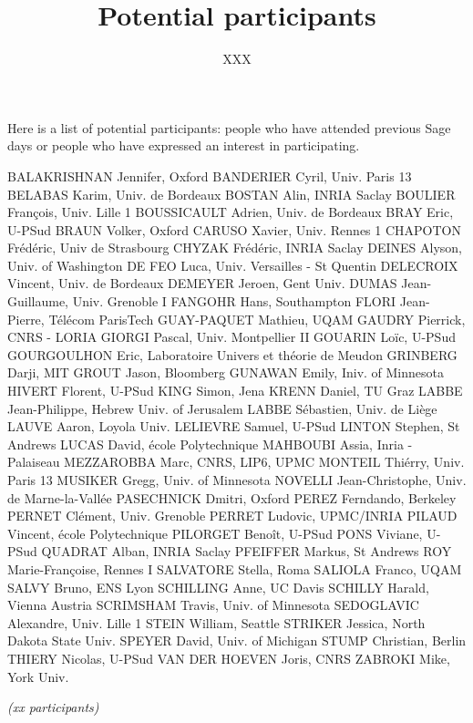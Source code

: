 \documentclass{paper}
\title{Potential participants}
\subtitle{XXX}
\date{}
\begin{document}
\maketitle
\thispagestyle{empty}

Here is a list of potential participants: people who have attended previous Sage days 
or people who have expressed an interest in participating. 

\bigskip

\obeylines
BALAKRISHNAN Jennifer, Oxford 
BANDERIER Cyril, Univ. Paris 13
BELABAS Karim, Univ. de Bordeaux
BOSTAN Alin, INRIA Saclay
BOULIER François, Univ. Lille 1
BOUSSICAULT Adrien, Univ. de Bordeaux
BRAY Eric, U-PSud
BRAUN Volker, Oxford
CARUSO Xavier, Univ. Rennes 1
CHAPOTON Frédéric, Univ de Strasbourg
CHYZAK Frédéric, INRIA Saclay
DEINES Alyson, Univ. of Washington
DE FEO Luca, Univ. Versailles - St Quentin
DELECROIX Vincent, Univ. de Bordeaux
DEMEYER Jeroen, Gent Univ.
DUMAS Jean-Guillaume, Univ. Grenoble I
FANGOHR Hans, Southampton
FLORI Jean-Pierre, Télécom ParisTech
GUAY-PAQUET Mathieu, UQAM
GAUDRY Pierrick, CNRS - LORIA
GIORGI Pascal, Univ. Montpellier II
GOUARIN Loïc, U-PSud
GOURGOULHON Eric, Laboratoire Univers et théorie de Meudon
GRINBERG Darji, MIT
GROUT Jason, Bloomberg
GUNAWAN Emily, Iniv. of Minnesota
HIVERT Florent, U-PSud
KING Simon, Jena
KRENN Daniel, TU Graz
LABBE Jean-Philippe, Hebrew Univ. of Jerusalem
LABBE Sébastien, Univ. de Liège
LAUVE Aaron, Loyola Univ.
LELIEVRE Samuel, U-PSud
LINTON Stephen, St Andrews
LUCAS David, école Polytechnique
MAHBOUBI Assia, Inria - Palaiseau
MEZZAROBBA Marc, CNRS, LIP6, UPMC
MONTEIL Thiérry, Univ. Paris 13
MUSIKER Gregg, Univ. of Minnesota
NOVELLI Jean-Christophe, Univ. de Marne-la-Vallée
PASECHNICK Dmitri, Oxford
PEREZ Ferndando, Berkeley
PERNET Clément, Univ. Grenoble
PERRET Ludovic, UPMC/INRIA
PILAUD Vincent, école Polytechnique
PILORGET Benoît, U-PSud
PONS Viviane, U-PSud
QUADRAT Alban, INRIA Saclay
PFEIFFER Markus, St Andrews
ROY Marie-Françoise, Rennes I
SALVATORE Stella, Roma
SALIOLA Franco, UQAM
SALVY Bruno, ENS Lyon
SCHILLING Anne, UC Davis
SCHILLY Harald, Vienna Austria
SCRIMSHAM Travis, Univ. of Minnesota
SEDOGLAVIC Alexandre, Univ. Lille 1
STEIN William, Seattle
STRIKER Jessica, North Dakota State Univ.
SPEYER David, Univ. of Michigan
STUMP Christian, Berlin
THIERY Nicolas, U-PSud
VAN DER HOEVEN Joris, CNRS
ZABROKI Mike, York Univ.

\medskip
\emph{(xx participants)}
\end{document}
